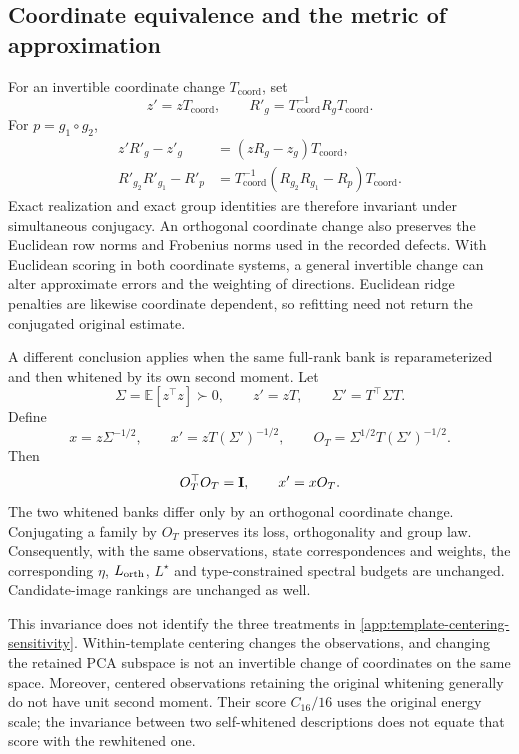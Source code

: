 \subsection{Coordinate equivalence and the metric of approximation}
\label{app:coordinates}

For an invertible coordinate change $T_{\mathrm{coord}}$,
set
\[
 z'=zT_{\mathrm{coord}},
 \qquad
 R'_g=T_{\mathrm{coord}}^{-1}R_gT_{\mathrm{coord}}.
\]
For $p=g_1\circ g_2$,
\[
 \begin{aligned}
 z'R'_g-z'_g
 &=(zR_g-z_g)T_{\mathrm{coord}},\\
 R'_{g_2}R'_{g_1}-R'_p
 &=
 T_{\mathrm{coord}}^{-1}
 (R_{g_2}R_{g_1}-R_p)
 T_{\mathrm{coord}}.
 \end{aligned}
\]
Exact realization and exact group identities are
therefore invariant under simultaneous conjugacy.
An orthogonal coordinate change also preserves the
Euclidean row norms and Frobenius norms used in the
recorded defects.
With Euclidean scoring in both coordinate systems, a
general invertible change can alter approximate errors
and the weighting of directions.
Euclidean ridge penalties are likewise coordinate
dependent, so refitting need not return the conjugated
original estimate.

A different conclusion applies when the same full-rank
bank is reparameterized and then whitened by its own
second moment.
Let
\[
 \Sigma=\mathbb E[z^\top z]\succ0,
 \qquad
 z'=zT,
 \qquad
 \Sigma'=T^\top\Sigma T.
\]
Define
\[
 x=z\Sigma^{-1/2},
 \qquad
 x'=zT(\Sigma')^{-1/2},
 \qquad
 O_T=\Sigma^{1/2}T(\Sigma')^{-1/2}.
\]
Then
\[
 O_T^\top O_T=\mathbf{I},
 \qquad
 x'=xO_T.
\]
The two whitened banks differ only by an orthogonal
coordinate change.
Conjugating a family by $O_T$ preserves its loss,
orthogonality and group law.
Consequently, with the same observations, state
correspondences and weights, the corresponding
$\eta$, $L_{\rm orth}$, $L^\star$ and type-constrained
spectral budgets are unchanged.
Candidate-image rankings are unchanged as well.

This invariance does not identify the three treatments
in \cref{app:template-centering-sensitivity}.
Within-template centering changes the observations,
and changing the retained PCA subspace is not an
invertible change of coordinates on the same space.
Moreover, centered observations retaining the original
whitening generally do not have unit second moment.
Their score $C_{16}/16$ uses the original energy scale;
the invariance between two self-whitened descriptions
does not equate that score with the rewhitened one.

